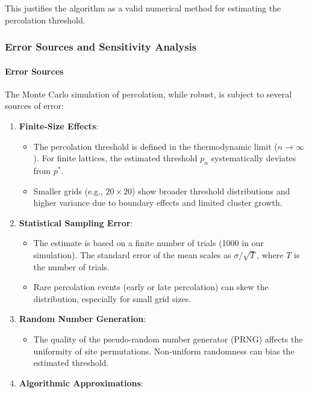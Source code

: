 \documentclass[11pt]{article}
\providecommand{\tightlist}{%
      \setlength{\itemsep}{0pt}\setlength{\parskip}{0pt}}
\begin{document}
This justifies the algorithm as a valid numerical method for estimating
the percolation threshold.

    \subsubsection{Error Sources and Sensitivity
Analysis}\label{error-sources-and-sensitivity-analysis}

\paragraph{Error Sources}\label{error-sources}

The Monte Carlo simulation of percolation, while robust, is subject to
several sources of error:

\begin{enumerate}
\def\labelenumi{\arabic{enumi}.}
\item
  \textbf{Finite-Size Effects}:

  \begin{itemize}
  \tightlist
  \item
    The percolation threshold is defined in the thermodynamic limit
    (\(n\to\infty\)). For finite lattices, the estimated threshold
    \(p_n\) systematically deviates from \(p^*\).
  \item
    Smaller grids (e.g., \(20\times20\)) show broader threshold
    distributions and higher variance due to boundary effects and
    limited cluster growth.
  \end{itemize}
\item
  \textbf{Statistical Sampling Error}:

  \begin{itemize}
  \tightlist
  \item
    The estimate is based on a finite number of trials (1000 in our
    simulation). The standard error of the mean scales as
    \(\sigma/\sqrt{T}\), where \(T\) is the number of trials.
  \item
    Rare percolation events (early or late percolation) can skew the
    distribution, especially for small grid sizes.
  \end{itemize}
\item
  \textbf{Random Number Generation}:

  \begin{itemize}
  \tightlist
  \item
    The quality of the pseudo-random number generator (PRNG) affects the
    uniformity of site permutations. Non-uniform randomness can bias the
    estimated threshold.
  \end{itemize}
\item
  \textbf{Algorithmic Approximations}:


\end{enumerate}
\end{document}
